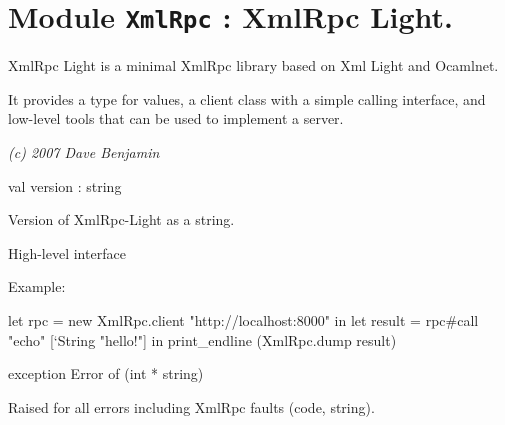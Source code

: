 \documentclass[11pt]{article}
\begin{document}
\tableofcontents
\section{Module {\tt{XmlRpc}} : XmlRpc Light.}
\label{module:XmlRpc}



    XmlRpc Light is a minimal XmlRpc library based on Xml Light and Ocamlnet.


    It provides a type for values, a client class with a simple calling
    interface, and low-level tools that can be used to implement a server.


    {\it (c) 2007 Dave Benjamin}



\ocamldocvspace{0.5cm}



\label{val:XmlRpc.version}\begin{ocamldoccode}
val version : string
\end{ocamldoccode}
\begin{ocamldocdescription}
Version of XmlRpc-Light as a string.


\end{ocamldocdescription}




High-level interface



Example: \begin{ocamldoccode}

    let rpc = new XmlRpc.client "http://localhost:8000" in
    let result = rpc#call "echo" [`String "hello!"] in
    print_endline (XmlRpc.dump result) 
\end{ocamldoccode}




\label{exception:XmlRpc.Error}\begin{ocamldoccode}
exception Error of (int * string)
\end{ocamldoccode}
\begin{ocamldocdescription}
Raised for all errors including XmlRpc faults (code, string).


\end{ocamldocdescription}
\end{document}
